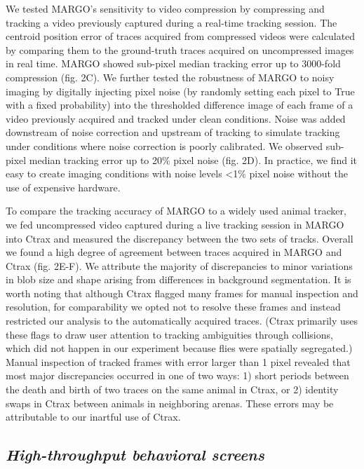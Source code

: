 \documentclass[10pt]{article}
\begin{document}
\begin{multicols}{2}
We tested MARGO's sensitivity to video compression by compressing and tracking a video previously captured during a real-time tracking session. The centroid position error of traces acquired from compressed videos were calculated by comparing them to the ground-truth traces acquired on uncompressed images in real time. MARGO showed sub-pixel median tracking error up to 3000-fold compression (fig. 2C). We further tested the robustness of MARGO to noisy imaging by digitally injecting pixel noise (by randomly setting each pixel to True with a fixed probability) into the thresholded difference image of each frame of a video previously acquired and tracked under clean conditions. Noise was added downstream of noise correction and upstream of tracking to simulate tracking under conditions where noise correction is poorly calibrated. We observed sub-pixel median tracking error up to 20\% pixel noise (fig. 2D). In practice, we find it easy to create imaging conditions with noise levels <1\% pixel noise without the use of expensive hardware.

To compare the tracking accuracy of MARGO to a widely used animal tracker, we fed uncompressed video captured during a live tracking session in MARGO into Ctrax \citep{Branson_High_2009} and measured the discrepancy between the two sets of tracks. Overall we found a high degree of agreement between traces acquired in MARGO and Ctrax (fig. 2E-F). We attribute the majority of discrepancies to minor variations in blob size and shape arising from differences in background segmentation. It is worth noting that although Ctrax flagged many frames for manual inspection and resolution, for comparability we opted not to resolve these frames and instead restricted our analysis to the automatically acquired traces. (Ctrax primarily uses these flags to draw user attention to tracking ambiguities through collisions, which did not happen in our experiment because flies were spatially segregated.) Manual inspection of tracked frames with error larger than 1 pixel revealed that most major discrepancies occurred in one of two ways: 1) short periods between the death and birth of two traces on the same animal in Ctrax, or 2) identity swaps in Ctrax between animals in neighboring arenas. These errors may be attributable to our inartful use of Ctrax.

\subsection*{\textit{High-throughput behavioral screens}}


\end{multicols}
\end{document}
